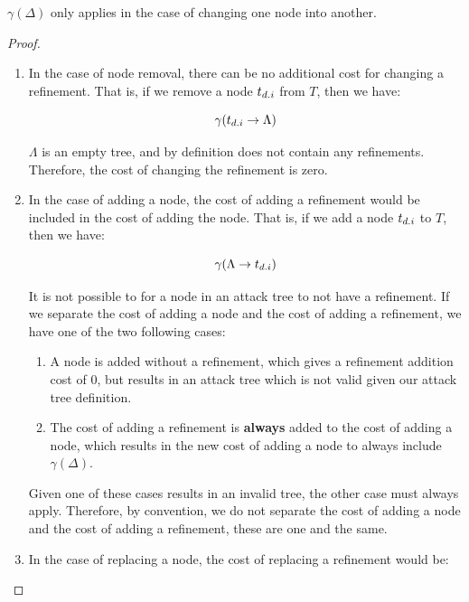 \begin{lemma}\label{lem:gamma-delta}

    $\gamma(\Delta)$ only applies in the case of changing one node into another.

    \begin{proof}


        \begin{enumerate}
            \item In the case of node removal, there can be no additional cost for changing a refinement. That is, if we remove a node $t_{{d}.{i}}$ from $T$, then we have:

                  $$\gamma(t_{{d}.{i}} \rightarrow {\Lambda})$$

                  $\Lambda$ is an empty tree, and by definition does not contain any refinements. Therefore, the cost of changing the refinement is zero.

            \item In the case of adding a node, the cost of adding a refinement would be included in the cost of adding the node. That is, if we add a node $t_{{d}.{i}}$ to $T$, then we have:

                  $$\gamma(\Lambda \rightarrow {t_{{d}.{i}}})$$

                  It is not possible to for a node in an attack tree to not have a refinement. If we separate the cost of adding a node and the cost of adding a refinement, we have one of the two following cases:
                  \begin{enumerate}
                      \item A node is added without a refinement, which gives a refinement addition cost of 0, but results in an attack tree which is not valid given our attack tree definition.
                      \item The cost of adding a refinement is \textbf{always} added to the cost of adding a node, which results in the new cost of adding a node to always include $\gamma(\Delta)$.
                  \end{enumerate}

                  Given one of these cases results in an invalid tree, the other case must always apply. Therefore, by convention, we do not separate the cost of adding a node and the cost of adding a refinement, these are one and the same.

            \item In the case of replacing a node, the cost of replacing a refinement would be:


\end{enumerate}
\end{proof}
\end{lemma}
